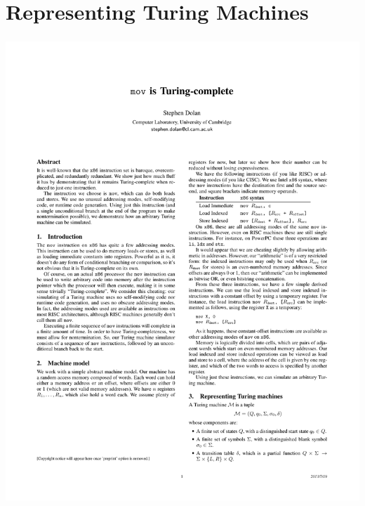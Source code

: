 \documentclass{beamer}
\begin{document}
\section{Representing Turing Machines}

\begin{frame}[fragile]
\frametitle{}

\begin{center}
\includegraphics[scale=0.5]{figures/TuringMachine}
\end{center}
\end{frame}
\end{document}

